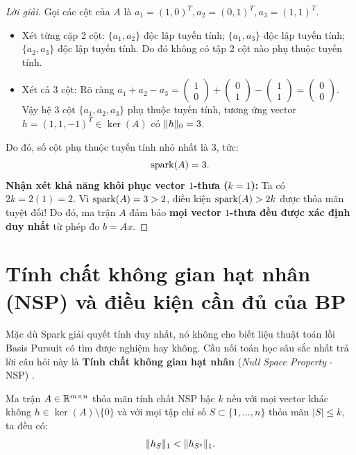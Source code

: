 \begin{proof}[Lời giải]
Gọi các cột của $A$ là $a_1 = (1, 0)^T, a_2 = (0, 1)^T, a_3 = (1, 1)^T$.
\begin{itemize}
    \item Xét từng cặp 2 cột:
    $\{a_1, a_2\}$ độc lập tuyến tính; $\{a_1, a_3\}$ độc lập tuyến tính; $\{a_2, a_3\}$ độc lập tuyến tính. Do đó không có tập 2 cột nào phụ thuộc tuyến tính.
    \item Xét cả 3 cột:
    Rõ ràng $a_1 + a_2 - a_3 = \begin{pmatrix} 1 \\ 0 \end{pmatrix} + \begin{pmatrix} 0 \\ 1 \end{pmatrix} - \begin{pmatrix} 1 \\ 1 \end{pmatrix} = \begin{pmatrix} 0 \\ 0 \end{pmatrix}$.
    Vậy hệ 3 cột $\{a_1, a_2, a_3\}$ phụ thuộc tuyến tính, tương ứng vector $h = (1, 1, -1)^T \in \ker(A)$ có $\|h\|_0 = 3$.
\end{itemize}
Do đó, số cột phụ thuộc tuyến tính nhỏ nhất là 3, tức:
\[
\operatorname{spark}(A) = 3.
\]
\textbf{Nhận xét khả năng khôi phục vector $1$-thưa ($k = 1$):}
Ta có $2k = 2(1) = 2$. Vì $\operatorname{spark}(A) = 3 > 2$, điều kiện $\operatorname{spark}(A) > 2k$ được thỏa mãn tuyệt đối! 
Do đó, ma trận $A$ đảm bảo \textbf{mọi vector $1$-thưa đều được xác định duy nhất} từ phép đo $b = Ax$.
\end{proof}

\section{Tính chất không gian hạt nhân (NSP) và điều kiện cần đủ của BP}
Mặc dù Spark giải quyết tính duy nhất, nó không cho biết liệu thuật toán lồi Basis Pursuit có tìm được nghiệm hay không. Cầu nối toán học sâu sắc nhất trả lời câu hỏi này là \textbf{Tính chất không gian hạt nhân} (\emph{Null Space Property} - NSP) \cite{foucart2013mathematical}.

\begin{definition}
Ma trận $A \in \mathbb{R}^{m \times n}$ thỏa mãn tính chất NSP bậc $k$ nếu với mọi vector khác không $h \in \ker(A) \setminus \{0\}$ và với mọi tập chỉ số $S \subset \{1, \dots, n\}$ thỏa mãn $|S| \le k$, ta đều có:
\begin{equation}
    \|h_S\|_1 < \|h_{S^c}\|_1.
    \label{eq:nsp_definition}
\end{equation}
\end{definition}

